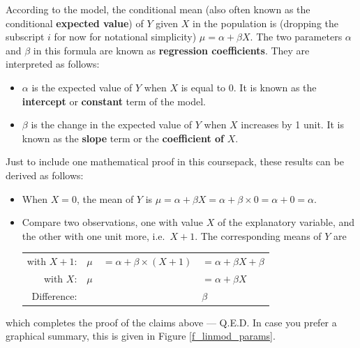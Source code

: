 According to the model, the conditional mean (also often known as the
conditional \textbf{expected value})
of $Y$ given $X$ in the
population is (dropping the subscript $i$ for now for notational
simplicity) $\mu=\alpha+\beta X$. The two parameters $\alpha$ and
$\beta$ in this formula are known as \textbf{regression coefficients}.
They are interpreted as follows:
\begin{itemize}
\item
$\alpha$ is the expected value of $Y$ when $X$ is equal to 0. It is
known as the \textbf{intercept} or \textbf{constant} term of the model.
\item
$\beta$ is the change in the expected value of $Y$ when $X$ increases by
1 unit. It is known as the \textbf{slope} term or the
\textbf{coefficient of} $X$.
\end{itemize}
Just to include one mathematical proof in this coursepack,
these results can be derived as follows:
\begin{itemize}
\item
When $X=0$, the mean of $Y$ is $\mu=\alpha+\beta X=\alpha+\beta\times 0
=\alpha+0=\alpha$.
\item
Compare two observations, one with value $X$ of the explanatory
variable, and the other with one unit more, i.e.\ $X+1$. The
corresponding means of $Y$ are


\begin{tabular}{rlll}
with $X+1$: & $\mu$ &
$=\alpha+\beta\times (X+1)$ &
$=\alpha+\beta X +\beta$ \\
with $X$: & $\mu$ &
& $=\alpha+\beta X$ \\ \hline
Difference: & & & $\beta$
\end{tabular}
\end{itemize}
which completes the proof of the claims above --- Q.E.D. In case you
prefer a graphical summary, this is given in Figure \ref{f_linmod_params}.

